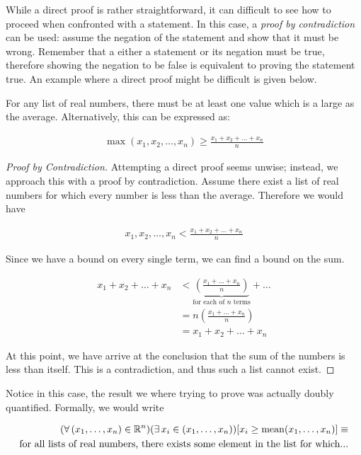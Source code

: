 While a direct proof is rather straightforward, it can difficult to see how to proceed when confronted with a statement. In this case, a \emph{proof by contradiction} can be used: assume the negation of the statement and show that it must be wrong. Remember that a either a statement or its negation must be true, therefore showing the negation to be false is equivalent to proving the statement true. An example where a direct proof might be difficult is given below.

\vspace{\baselineskip}
\begin{theorem}
	For any list of real numbers, there must be at least one value which is a large as the average. Alternatively, this can be expressed as:
	
	\begin{align}
		\max(x_1, x_2, \dots, x_n) \ge \frac{x_1 + x_2 + \dots + x_n}{n}
	\end{align}
\end{theorem}

\begin{proof}[Proof by Contradiction]
	Attempting a direct proof seems unwise; instead, we approach this with a proof by contradiction. Assume there exist a list of real numbers for which every number is less than the average. Therefore we would have
	
	\begin{align*}
		x_1, x_2, \dots, x_n < \frac{x_1 + x_2 + \dots + x_n}{n}
	\end{align*} 
	
	Since we have a bound on every single term, we can find a bound on the sum.
	
	\begin{align*}
		x_1 + x_2 + \dots + x_n &< \underbrace{\left( \frac{x_1 + \dots + x_n}{n} \right)}_\text{for each of $n$ terms} + \dots \\
		&= n \left( \frac{x_1 + \dots + x_n}{n} \right) \\
		&= x_1 + x_2 + \dots + x_n
	\end{align*}
	
	At this point, we have arrive at the conclusion that the sum of the numbers is less than itself. This is a contradiction, and thus such a list cannot exist.
\end{proof}

Notice in this case, the result we where trying to prove was actually doubly quantified. Formally, we would write

\begin{align*}
	(\forall \, (x_1, \dots, x_n) \in \mathbb{R}^n)(\exists \, x_i \in (x_1, \dots, x_n))[x_i \ge \operatorname{mean}(x_1, \dots, x_n)] \equiv \\
	\text{for all lists of real numbers, there exists some element in the list for which...}
\end{align*}

